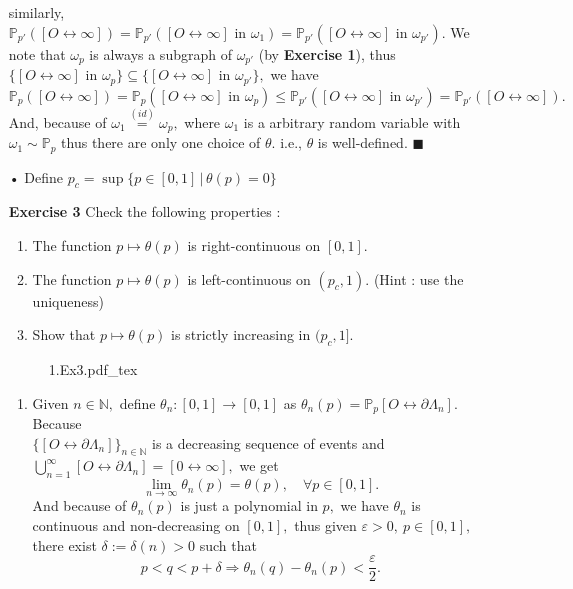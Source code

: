 \documentclass[12pt,a4paper]{report}
\theoremstyle{definition}
\newcommand{\SOL}{\fbox{ \tt s\parbox[b][2pt][c]{6pt}{o}\hspace*{-7pt} L:}}
\newcommand{\incfig}[1]{%
{#1.pdf_tex}
}
\begin{document}
\begin{enumerate}
	\newpage
	similarly, $\mathbb{P}_{p'}([O\leftrightarrow\infty])=\mathbb{P}_{p'}([O\leftrightarrow\infty]\mbox{ in }\omega_1)=\mathbb{P}_{p'}([O\leftrightarrow\infty]\mbox{ in }\omega_{p'}).$ We note that $\omega_p$ is always a subgraph of $\omega_{p'}$ (by \textbf{Exercise 1}), thus $\{[O\leftrightarrow\infty]\mbox{ in }\omega_p\}\subseteq\{[O\leftrightarrow\infty]\mbox{ in }\omega_{p'}\},$ we have $\mathbb{P}_p([O\leftrightarrow\infty])=\mathbb{P}_p([O\leftrightarrow\infty]\mbox{ in }\omega_p)\leq \mathbb{P}_{p'}([O\leftrightarrow\infty]\mbox{ in }\omega_{p'})=\mathbb{P}_{p'}([O\leftrightarrow\infty]).$\\
	And, because of $\omega_1\overset{(id)}{=}\omega_p,$ where $\omega_1$ is a arbitrary random variable with $\omega_1\sim\mathbb{P}_p$ thus there are only one choice of $\theta.$ i.e., $\theta$ is well-defined. $\blacksquare$
	\item[•] Define $p_c=\sup\{p\in [0,1]\,|\,\theta(p)=0\}$
	\item[\textbf{Exercise 3}] Check the following properties : 
	\begin{enumerate}
		\item The function $p\mapsto\theta(p)$ is right-continuous on $[0,1].$
		\item The function $p\mapsto\theta(p)$ is left-continuous on $(p_c,1).$ (Hint : use the uniqueness)
		\item Show that $p\mapsto \theta(p)$ is strictly increasing in $(p_c,1].$
	\end{enumerate}
	\begin{figure}[htp]
	\centering
	\def\svgwidth{12cm}
	\incfig{1.Ex3}
	\end{figure}
	\item[\SOL]\begin{enumerate}
	    \item Given $n\in\mathbb{N},$ define $\theta_n:[0,1]\to [0,1]$ as $\theta_n(p)=\mathbb{P}_p[O\leftrightarrow\partial\Lambda_n].$ Because\\ $\{[O\leftrightarrow\partial\Lambda_n]\}_{n\in\mathbb{N}}$ is a decreasing sequence of events and $\bigcup\limits_{n=1}^\infty[O\leftrightarrow\partial\Lambda_n]=[0\leftrightarrow\infty],$ we get 
	    \[
	    \lim_{n\to\infty}\theta_n(p)=\theta(p),\quad \forall p\in [0,1].
	    \]
	    And because of $\theta_n(p)$ is just a polynomial in $p,$ we have $\theta_n$ is continuous and non-decreasing on $[0,1],$ thus given $\varepsilon>0,\ p\in [0,1],$ there exist $\delta:=\delta(n)>0$ such that 
	    \[
	    p<q<p+\delta\Rightarrow \theta_n(q)-\theta_n(p)<\frac{\varepsilon}{2}.
\]
\end{enumerate}
\end{enumerate}
\end{document}
